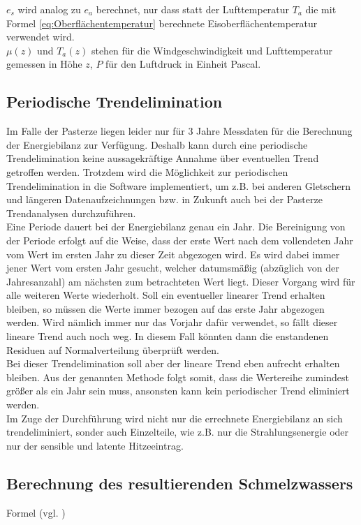 \documentclass[12pt,a4paper]{article}
\begin{document}
$e_s$ wird analog zu $e_a$ berechnet, nur dass statt der Lufttemperatur $T_a$ die mit Formel \ref{eq:Oberflächentemperatur} berechnete Eisoberflächentemperatur verwendet wird.\\
$\mu(z)$ und $T_a(z)$ stehen für die Windgeschwindigkeit und Lufttemperatur gemessen in Höhe $z$, $P$ für den Luftdruck in Einheit Pascal.


\subsection{Periodische Trendelimination}\label{Periodische Trendelimination}
Im Falle der Pasterze liegen leider nur für 3 Jahre Messdaten für die Berechnung der Energiebilanz zur Verfügung. Deshalb kann durch eine periodische Trendelimination keine aussagekräftige Annahme über eventuellen Trend getroffen werden. Trotzdem wird die Möglichkeit zur periodischen Trendelimination in die Software implementiert, um z.B. bei anderen Gletschern und längeren Datenaufzeichnungen bzw. in Zukunft auch bei der Pasterze Trendanalysen durchzuführen.\\

Eine Periode dauert bei der Energiebilanz genau ein Jahr. Die Bereinigung von der Periode erfolgt auf die Weise, dass der erste Wert nach dem vollendeten Jahr vom Wert im ersten Jahr zu dieser Zeit abgezogen wird. Es wird dabei immer jener Wert vom ersten Jahr gesucht, welcher datumsmäßig (abzüglich von der Jahresanzahl) am nächsten zum betrachteten Wert liegt. Dieser Vorgang wird für alle weiteren Werte wiederholt. Soll ein eventueller linearer Trend erhalten bleiben, so müssen die Werte immer bezogen auf das erste Jahr abgezogen werden. Wird nämlich immer nur das Vorjahr dafür verwendet, so fällt dieser lineare Trend auch noch weg. In diesem Fall könnten dann die enstandenen Residuen auf Normalverteilung überprüft werden.\\
Bei dieser Trendelimination soll aber der lineare Trend eben aufrecht erhalten bleiben. Aus der genannten Methode folgt somit, dass die Wertereihe zumindest größer als ein Jahr sein muss, ansonsten kann kein periodischer Trend eliminiert werden.\\

Im Zuge der Durchführung wird nicht nur die errechnete Energiebilanz an sich trendeliminiert, sonder auch Einzelteile, wie z.B. nur die Strahlungsenergie oder nur der sensible und latente Hitzeeintrag.


\subsection{Berechnung des resultierenden Schmelzwassers}
Formel (vgl. \cite[142]{ThePhysicsOfGlaciers})
\end{document}
